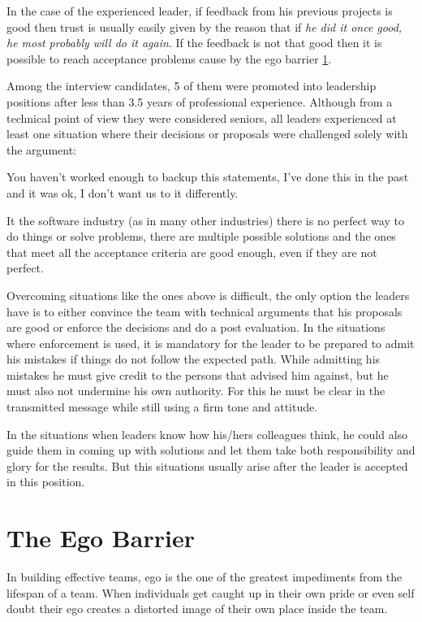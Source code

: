 In the case of the experienced leader, if feedback from his previous projects is good then trust is usually easily given by the reason that if \textit{he did it once good, he most probably will do it again}. If the feedback is not that good then it is possible to reach acceptance problems cause by the ego barrier \ref{sec:ego}.

Among the interview candidates, 5 of them were promoted into leadership positions after less than 3.5 years of professional experience. Although from a technical point of view they were considered seniors, all  leaders experienced at least one situation where their decisions or proposals were challenged solely with the argument:
\begin{displayquote}
You haven't worked enough to backup this statements, I've done this in the past and it was ok, I don't want us to it differently.
\end{displayquote}
It the software industry (as in many other industries) there is no perfect way to do things or solve problems, there are multiple possible solutions and the ones that meet all the acceptance criteria are good enough, even if they are not perfect.

Overcoming situations like the ones above is difficult, the only option the leaders have is to either convince the team with technical arguments that his proposals are good or enforce the decisions and do a post evaluation. In the situations where enforcement is used, it is mandatory for the leader to be prepared to admit his mistakes if things do not follow the expected path. While admitting his mistakes he must give credit to the persons that advised him against, but he must also not undermine his own authority. For this he must be clear in the transmitted message while still using a firm tone and attitude. 

In the situations when leaders know how his/hers colleagues think, he could also guide them in coming up with solutions and let them take both responsibility and glory for the results. But this situations usually arise after the leader is accepted in this position.
\section{The Ego Barrier}
\label{sec:ego}
In building effective teams, ego is the one of the greatest impediments from the lifespan of a team. When individuals get caught up in their own pride or even self doubt their ego creates a distorted image of their own place inside the team. 

